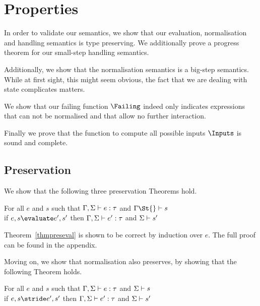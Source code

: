 


\section{Properties}




In order to validate our semantics, we show that our evaluation, normalisation
and handling semantics is type preserving. We additionally prove a progress
theorem for our small-step handling semantics.

Additionally, we show that the normalisation semantics is a big-step semantics.
While at first sight, this might seem obvious, the fact that we are dealing with
state complicates matters.

We show that our failing function $\Failing$ indeed only indicates expressions
that can not be normalised and that allow no further interaction.

Finally we prove that the function to compute all possible inputs $\Inputs$ is sound and complete.



\subsection{Preservation}

We show that the following three preservation Theorems hold.

\begin{theorem}
      For all $e$ and $s$ such that
      $\Gamma,\Sigma\vdash e:\tau$ and $\Gamma\St{}\infers s$\\
      if $e,s\evaluate e',s'$
      then $\Gamma,\Sigma\vdash e':\tau$ and $\Sigma\vdash s'$
      \label{thmpreseval}
\end{theorem}

Theorem~\ref{thmpreseval} is shown to be correct by induction over $e$. The full
proof can be found in the appendix.


Moving on, we show that normalisation also preserves, by showing that the
following Theorem holds.

\begin{theorem}
    For all $e$ and $s$ such that $\Gamma,\Sigma\vdash e:\tau$ and $\Sigma\vdash s$\\
    if   $e,s \stride e',s'$ then $\Gamma,\Sigma\vdash e':\tau$ and $\Sigma\vdash s'$
    \label{thmpresnorm}
\end{theorem}


